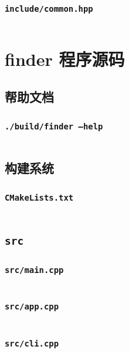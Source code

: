\documentclass[12pt, a4paper]{ctexart}
\begin{document}
\subsubsection{\texttt{include/common.hpp}}
\inputminted{cpp}{../sorter/include/common.hpp}

\section{finder 程序源码}

\subsection{帮助文档}

\subsubsection{\texttt{./build/finder --help}}
\inputminted{text}{../finder/res/help.txt}

\subsection{构建系统}

\subsubsection{\texttt{CMakeLists.txt}}
\inputminted{cmake}{../finder/CMakeLists.txt}

\subsection{\texttt{src}}

\subsubsection{\texttt{src/main.cpp}}
\inputminted{cpp}{../finder/src/main.cpp}

\subsubsection{\texttt{src/app.cpp}}
\inputminted{cpp}{../finder/src/app.cpp}

\subsubsection{\texttt{src/cli.cpp}}
\inputminted{cpp}{../finder/src/cli.cpp}
\end{document}
